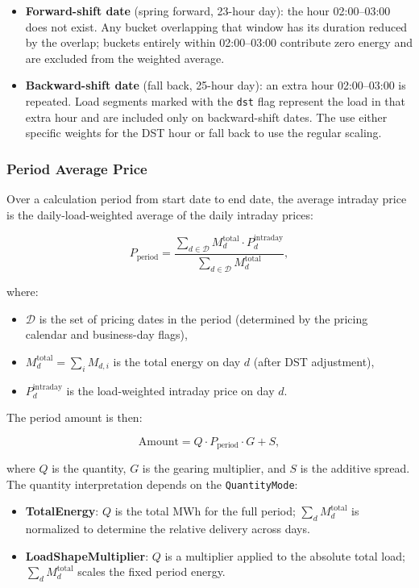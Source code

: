 \begin{itemize}
\item \textbf{Forward-shift date} (spring forward, 23-hour day): the hour 02:00--03:00 does not exist. Any bucket overlapping that window has its duration reduced by the overlap; buckets entirely within 02:00--03:00 contribute zero energy and are excluded from the weighted average.
\item \textbf{Backward-shift date} (fall back, 25-hour day): an extra hour 02:00--03:00 is repeated. Load segments marked with the \lstinline!dst! flag represent the load in that extra hour and are included only on backward-shift dates. The use either specific weights for the DST hour or fall back to use the regular scaling.
\end{itemize}

\subsubsection{Period Average Price}

Over a calculation period from start date to end date, the average intraday price is the daily-load-weighted average of the daily intraday prices:

$$
P_{\mathrm{period}} = \frac{\sum_{d \in \mathcal{D}} M_d^{\mathrm{total}} \cdot P_d^{\mathrm{intraday}}}{\sum_{d \in \mathcal{D}} M_d^{\mathrm{total}}},
$$

where:
\begin{itemize}
\item $\mathcal{D}$ is the set of pricing dates in the period (determined by the pricing calendar and business-day flags),
\item $M_d^{\mathrm{total}} = \sum_i M_{d,i}$ is the total energy on day $d$ (after DST adjustment),
\item $P_d^{\mathrm{intraday}}$ is the load-weighted intraday price on day $d$.
\end{itemize}

The period amount is then:

$$
\mathrm{Amount} = Q \cdot P_{\mathrm{period}} \cdot G + S,
$$

where $Q$ is the quantity, $G$ is the gearing multiplier, and $S$ is the additive spread. The quantity interpretation depends on the \lstinline!QuantityMode!:

\begin{itemize}
\item \textbf{TotalEnergy}: $Q$ is the total MWh for the full period; $\sum_d M_d^{\mathrm{total}}$ is normalized to determine the relative delivery across days.
\item \textbf{LoadShapeMultiplier}: $Q$ is a multiplier applied to the absolute total load; $\sum_d M_d^{\mathrm{total}}$ scales the fixed period energy.
\end{itemize}

